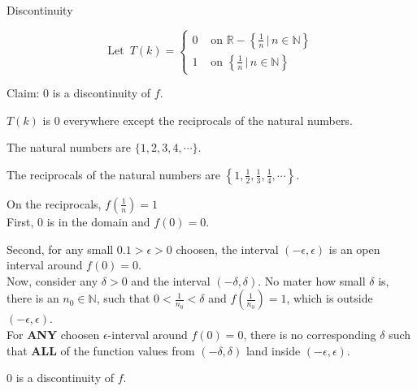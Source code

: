 \documentclass{ximera}
\begin{document}
\begin{example}  Discontinuity


\[
\text{Let } \, T(k) = 
\begin{cases}
  0 & \text{ on } \mathbb{R} - \left\{ \frac{1}{n} \, | \, n \in \mathbb{N}     \right\} \\
  1  & \text{ on } \left\{ \frac{1}{n} \, | \, n \in \mathbb{N}     \right\}
\end{cases}
\]



Claim: $0$ is a discontinuity of $f$. \\



\begin{explanation}

$T(k)$ is $0$ everywhere except the reciprocals of the natural numbers.

The natural numbers are $\{ 1, 2, 3, 4, \cdots \}$.

The reciprocals of the natural numbers are $\left\{ 1, \frac{1}{2}, \frac{1}{3}, \frac{1}{4}, \cdots \right\}$.

On the reciprocals, $f\left(\frac{1}{n}\right) = 1$ \\



First, $0$ is in the domain and $f(0) = 0$.

Second, for any small $0.1 > \epsilon > 0$ choosen, the interval $(-\epsilon, \epsilon)$ is an open interval around $f(0) = 0$. \\



Now, consider any $\delta > 0$ and the interval $(-\delta, \delta)$. No mater how small $\delta$ is, there is an $n_0 \in \mathbb{N}$, such that $0 < \frac{1}{n_0} < \delta$ and $f\left(\frac{1}{n_0}\right) = 1$, which is outside $(-\epsilon, \epsilon)$. \\




For \textbf{\textcolor{red!50!blue!90!black}{ANY}} choosen $\epsilon$-interval around $f(0)= 0$, there is no corresponding $\delta$ such that \textbf{\textcolor{red!50!blue!90!black}{ALL}} of the function values from  $(-\delta, \delta)$ land inside $(-\epsilon, \epsilon)$.


$0$ is a discontinuity of $f$.

\end{explanation}

\end{example}
\end{document}
